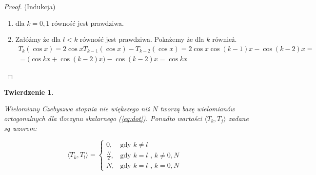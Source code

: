 \documentclass{article}
\newtheorem{theorem}{Twierdzenie}
\newcommand{\dotproduct}[2] {
	\langle #1 , #2 \rangle
}
\begin{document}
\begin{proof} 
	(Indukcja)
	\begin{enumerate}
		\item dla $k = 0, 1$ równość jest prawdziwa.
		\item Załóżmy że dla $l < k$ równość jest prawdziwa. Pokażemy że dla $k$ również.
		\begin{gather*} 
			T_k(\cos{x}) = 2\cos{x} T_{k-1}(\cos{x}) - T_{k-2}(\cos{x}) = 2 \cos{x} \cos{(k-1)x} - \cos{(k-2)x} = \\
			= \big( \cos{kx} + \cos{(k-2)x} \big) - \cos{(k-2)x} = \cos{kx}
		\end{gather*}
	\end{enumerate}
\end{proof}

\begin{theorem}
	\label{th:orthogonality}

	Wielomiany Czebyszwa stopnia nie większego niż $N$ tworzą bazę wielomianów ortogonalnych dla iloczynu skalarnego (\ref{eq:dot}). Ponadto wartości $ \dotproduct{T_k}{T_j} $ zadane są wzorem:
	
	\begin{equation}
		\label{eq:orthogonality}
  		\dotproduct{T_k}{T_l} =
  		\begin{cases}
    	0, & \text{gdy $k \neq l$}\\
    	\frac{N}{2}, & \text{gdy $k = l$ , $k \neq 0, N$ } \\
    	N, & \text{gdy $k = l$ , $k =0, N$}
  		\end{cases}
	\end{equation}
	
	
\end{theorem}
\end{document}
